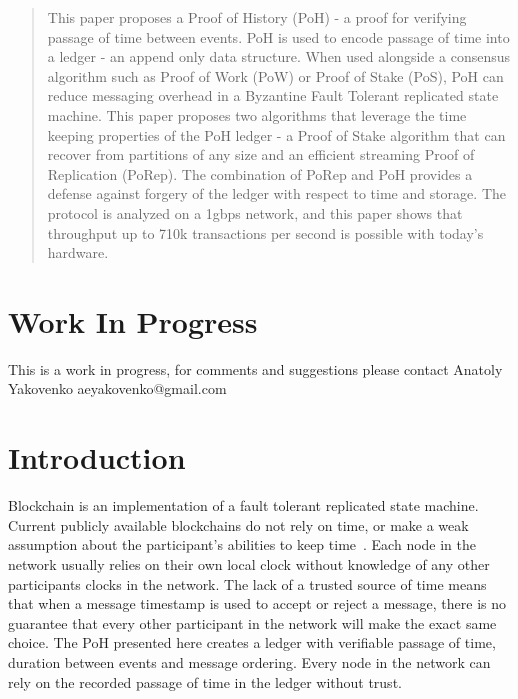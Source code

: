 \documentclass[12pt]{article}
\begin{document}
\maketitle

\begin{abstract}
This paper proposes a Proof of History (PoH) - a proof for verifying passage of time between events. PoH is used to encode passage of time into a ledger - an append only data structure.  When used alongside a consensus algorithm such as Proof of Work (PoW) or Proof of Stake (PoS), PoH can reduce messaging overhead in a Byzantine Fault Tolerant replicated state machine.  This paper proposes two algorithms that leverage the time keeping properties of the PoH ledger - a Proof of Stake algorithm that can recover from partitions of any size and an efficient streaming Proof of Replication (PoRep).  The combination of PoRep and PoH provides a defense against forgery of the ledger with respect to time and storage.  The protocol is analyzed on a 1gbps network, and this paper shows that throughput up to 710k transactions per second is possible with today's hardware.
\end{abstract}

\section{Work In Progress}
This is a work in progress, for comments and suggestions please contact Anatoly Yakovenko aeyakovenko@gmail.com

\section{Introduction}
Blockchain is an implementation of a fault tolerant replicated state machine.  Current publicly available blockchains do not rely on time, or make a weak assumption about the participant's abilities to keep time~\cite{tendermint}.  Each node in the network usually relies on their own local clock without knowledge of any other participants clocks in the network.  The lack of a trusted source of time means that when a message timestamp is used to accept or reject a message, there is no guarantee that every other participant in the network will make the exact same choice.  The PoH presented here creates a ledger with verifiable passage of time, duration between events and message ordering. Every node in the network can rely on the recorded passage of time in the ledger without trust.
\end{document}
